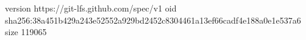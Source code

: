 version https://git-lfs.github.com/spec/v1
oid sha256:38a451b429a243e52552a929bd2452c8304461a13ef66cadf4e188a0e1e537a6
size 119065
